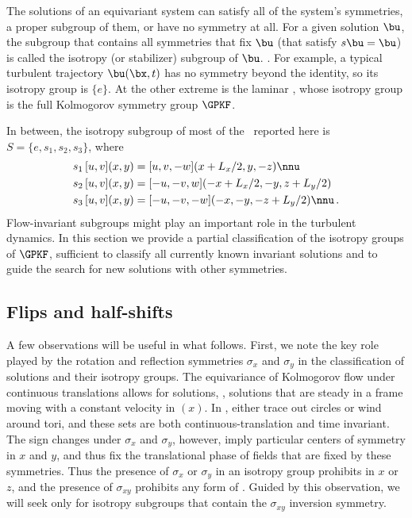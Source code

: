 The solutions of an equivariant system can satisfy all of the system's
symmetries, a proper subgroup of them, or have no symmetry at all. For a
given solution $\bu$, the subgroup that contains all symmetries that fix
$\bu$ (that satisfy $s \bu = \bu$) is called the isotropy (or stabilizer)
subgroup of $\bu$. .
For example, a typical turbulent trajectory $\bu(\bx,t)$ has no symmetry
beyond the identity, so its isotropy group is $\{e\}$. At the other
extreme is the laminar {\eqv}, whose isotropy group is the full
Kolmogorov symmetry group $\GPKF$.

In between, the isotropy subgroup  of most
of the \eqva\ reported here is $S = \{e, s_1, s_2, s_3\}$, where
\begin{align}
s_1 \, [u,v](x,y) &= [u, v, -w](x+L_x/2, y, -z) \nnu \\
s_2 \, [u,v](x,y) &= [-u, -v, w](-x+L_x/2,-y,z+L_y/2) \label{shiftRot}\\
s_3 \, [u,v](x,y) &= [-u,-v,-w](-x, -y, -z+L_y/2) \nnu
\,.
\end{align}
Flow-invariant subgroups might play an important role in the turbulent
dynamics. In this section we provide a partial classification of the
isotropy groups of $\GPKF$, sufficient to classify all currently known
invariant solutions and to guide the search for new solutions with other
symmetries.


\subsection{Flips and half-shifts}
\label{s:flipnshift}

A few observations will be useful in what follows. First, we note the
key role played by the {rotation and reflection} symmetries $\sigma_x$
and $\sigma_y$  in the classification of solutions and
their isotropy groups. The equivariance of Kolmogorov flow under
continuous translations allows for {\reqva} solutions, \ie,
solutions that are steady in a frame moving with a constant velocity
in $(x)$. In {\statesp}, {\reqva} either trace out
circles or wind around tori, and these sets are both
continuous-translation and time invariant. The sign changes under
$\sigma_x$ and $\sigma_{y}$, however, imply particular
centers of symmetry in $x$ and $y$,
and thus fix the translational phase of fields that are fixed by these
symmetries. Thus the presence of $\sigma_x$ or $\sigma_y$ in an
isotropy group prohibits {\reqva} in $x$ or $z$, and the
presence of $\sigma_{xy}$ prohibits any form of {\reqv}. Guided
by this observation, we will seek {\eqva} only for isotropy subgroups
that contain the $\sigma_{xy}$ inversion symmetry.

